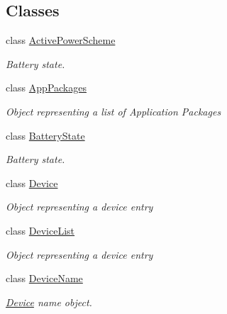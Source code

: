 \subsection*{Classes}
\begin{DoxyCompactItemize}
\item 
class \hyperlink{class_microsoft_1_1_tools_1_1_windows_device_portal_1_1_device_portal_1_1_active_power_scheme}{Active\+Power\+Scheme}
\begin{DoxyCompactList}\small\item\em Battery state. \end{DoxyCompactList}\item 
class \hyperlink{class_microsoft_1_1_tools_1_1_windows_device_portal_1_1_device_portal_1_1_app_packages}{App\+Packages}
\begin{DoxyCompactList}\small\item\em Object representing a list of Application Packages \end{DoxyCompactList}\item 
class \hyperlink{class_microsoft_1_1_tools_1_1_windows_device_portal_1_1_device_portal_1_1_battery_state}{Battery\+State}
\begin{DoxyCompactList}\small\item\em Battery state. \end{DoxyCompactList}\item 
class \hyperlink{class_microsoft_1_1_tools_1_1_windows_device_portal_1_1_device_portal_1_1_device}{Device}
\begin{DoxyCompactList}\small\item\em Object representing a device entry \end{DoxyCompactList}\item 
class \hyperlink{class_microsoft_1_1_tools_1_1_windows_device_portal_1_1_device_portal_1_1_device_list}{Device\+List}
\begin{DoxyCompactList}\small\item\em Object representing a device entry \end{DoxyCompactList}\item 
class \hyperlink{class_microsoft_1_1_tools_1_1_windows_device_portal_1_1_device_portal_1_1_device_name}{Device\+Name}
\begin{DoxyCompactList}\small\item\em \hyperlink{class_microsoft_1_1_tools_1_1_windows_device_portal_1_1_device_portal_1_1_device}{Device} name object. \end{DoxyCompactList}\item 

\end{DoxyCompactItemize}
